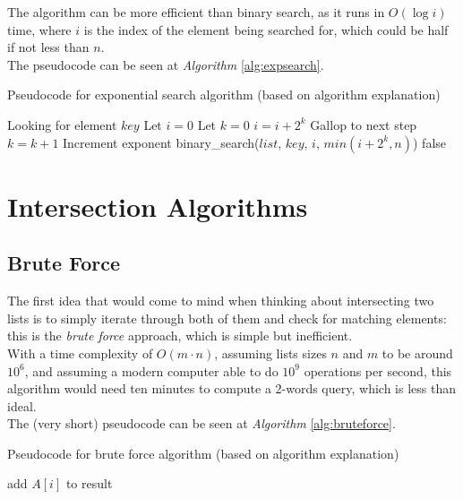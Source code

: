 The algorithm can be more efficient than binary search, as it runs in $O(\log i)$ time, where $i$ is the index of the element being searched for, which could be half if not less than $n$.\\
The pseudocode can be seen at \textit{Algorithm} \ref{alg:expsearch}.

\begin{algorithm}
    \captionsetup{labelsep=newline}
    \caption{Pseudocode for exponential search algorithm \label{alg:expsearch} (based on algorithm explanation)}
    \begin{algorithmic}[1]
        \State Looking for element $key$
        \State Let $i=0$ 
        \State Let $k=0$
            \State $i=i+2^k$ \Comment Gallop to next step
            \State $k=k+1$ \Comment Increment exponent
        \EndWhile
            \State binary\_search($list$, $key$, $i$, $min(i+2^k,n)$) 
        \Else
            \State \Return false 
        \EndIf
    \end{algorithmic}
\end{algorithm}

\section{Intersection Algorithms}

\subsection{Brute Force \label{sec:bruteforce}}

The first idea that would come to mind when thinking about intersecting two lists is to simply iterate through both of them and check for matching elements: this is the \textit{brute force} approach, which is simple but inefficient. \\
With a time complexity of $O(m \cdot n)$, assuming lists sizes $n$ and $m$ to be around $10^6$, and assuming a modern computer able to do $10^9$ operations per second, this algorithm would need ten minutes to compute a 2-words query, which is less than ideal.\\
The (very short) pseudocode can be seen at \textit{Algorithm} \ref{alg:bruteforce}.

\begin{algorithm}
    \captionsetup{labelsep=newline}
    \caption{Pseudocode for brute force algorithm \label{alg:bruteforce} (based on algorithm explanation)}
    \begin{algorithmic}[1]
                    \State add $A[i]$ to result
                \EndIf
            \EndFor
        \EndFor
    \end{algorithmic}
\end{algorithm}


